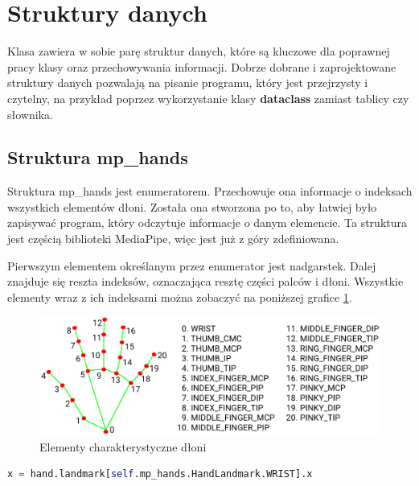 \section{Struktury danych}

\quad Klasa zawiera w sobie parę struktur danych, które są kluczowe dla poprawnej pracy klasy oraz przechowywania informacji. Dobrze dobrane i zaprojektowane struktury danych pozwalają na pisanie programu, który jest przejrzysty i czytelny, na przykład poprzez wykorzystanie klasy \textbf{dataclass} zamiast tablicy czy słownika. 

\subsection{Struktura mp\_hands}

\quad Struktura mp\_hands jest enumeratorem. Przechowuje ona informacje o indeksach wszystkich elementów dłoni. Została ona stworzona po to, aby łatwiej było zapisywać program, który odczytuje informacje o danym elemencie. Ta struktura jest częścią biblioteki MediaPipe, więc jest już z góry zdefiniowana. 

\quad Pierwszym elementem określanym przez enumerator jest nadgarstek. Dalej znajduje się reszta indeksów, oznaczająca resztę części palców i dłoni. Wszystkie elementy wraz z ich indeksami można zobaczyć na poniższej grafice \ref{img:hand_points}. 

\begin{figure}[H]
    \begin{center}
        \includegraphics[width=12.8cm]{../images/hand_landmarks.png}
        \caption{Elementy charakterystyczne dłoni}
        \label{img:hand_points}
    \end{center}
\end{figure}

\begin{lstlisting}[language=python, style=programming, caption={Przykładowe wykorzystanie \textbf{mp\_hands}},captionpos=b]
    x = hand.landmark[self.mp_hands.HandLandmark.WRIST].x
\end{lstlisting}

